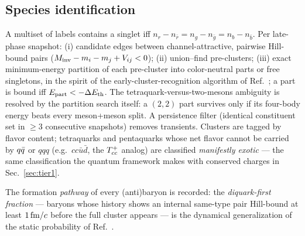 \subsection{Species identification}
\label{sec:cluster-id}

A multiset of labels contains a singlet iff
$n_r-n_{\bar r}=n_g-n_{\bar g}=n_b-n_{\bar b}$.  Per late-phase snapshot:
(i) candidate edges between channel-attractive, pairwise Hill-bound pairs
($M_{\rm inv}-m_i-m_j+V_{ij}<0$); (ii) union--find pre-clusters; (iii)
exact minimum-energy partition of each pre-cluster into color-neutral
parts or free singletons, in the spirit of the early-cluster-recognition
algorithm of Ref.~\cite{Dorso:1993zz}; a part is bound iff
$E_{\rm part}<-\Delta E_{\rm th}$.  The tetraquark-versus-two-mesons
ambiguity is resolved by the partition search itself: a $(2,2)$ part
survives only if its four-body energy beats every meson+meson split.  A
persistence filter (identical constituent set in $\ge 3$ consecutive
snapshots) removes transients.  Clusters are tagged by flavor content;
tetraquarks and pentaquarks whose net flavor cannot be carried by
$q\bar{q}$ or $qqq$ (e.g.\ $cc\bar u\bar d$, the $T_{cc}^{+}$ analog) are classified
\emph{manifestly exotic} --- the same classification the quantum framework
makes with conserved charges in Sec.~\ref{sec:tier1}.

The formation \emph{pathway} of every (anti)baryon is recorded: the
\emph{diquark-first fraction} --- baryons whose history shows an internal
same-type pair Hill-bound at least $1\,\mathrm{fm}/c$ before the full cluster
appears --- is the dynamical generalization of the static probability of
Ref.~\cite{Lebed:2016jvq}.
